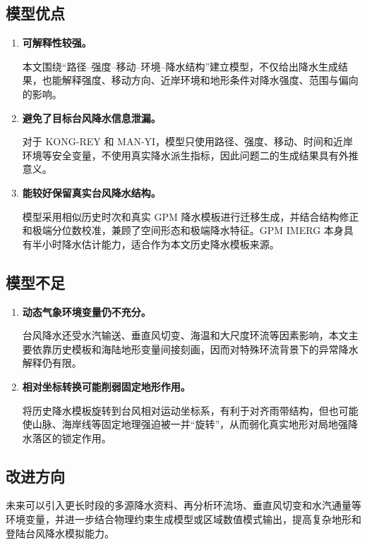 \documentclass[UTF8,a4paper,zihao=5,fontset=fandol]{ctexart}
\numberwithin{equation}{section}
\numberwithin{figure}{section}
\numberwithin{table}{section}
\begin{document}
\subsection{模型优点}
\begin{enumerate}
  \item \textbf{可解释性较强。}

  本文围绕“路径--强度--移动--环境--降水结构”建立模型，不仅给出降水生成结果，也能解释强度、移动方向、近岸环境和地形条件对降水强度、范围与偏向的影响。

  \item \textbf{避免了目标台风降水信息泄漏。}

  对于 KONG-REY 和 MAN-YI，模型只使用路径、强度、移动、时间和近岸环境等安全变量，不使用真实降水派生指标，因此问题二的生成结果具有外推意义。

  \item \textbf{能较好保留真实台风降水结构。}

  模型采用相似历史时次和真实 GPM 降水模板进行迁移生成，并结合结构修正和极端分位数校准，兼顾了空间形态和极端降水特征。GPM IMERG 本身具有半小时降水估计能力，适合作为本文历史降水模板来源\cite{ref2}。
\end{enumerate}

\subsection{模型不足}
\begin{enumerate}
  \item \textbf{动态气象环境变量仍不充分。}

  台风降水还受水汽输送、垂直风切变、海温和大尺度环流等因素影响，本文主要依靠历史模板和海陆地形变量间接刻画，因而对特殊环流背景下的异常降水解释仍有限。

  \item \textbf{相对坐标转换可能削弱固定地形作用。}

  将历史降水模板旋转到台风相对运动坐标系，有利于对齐雨带结构，但也可能使山脉、海岸线等固定地理强迫被一并“旋转”，从而弱化真实地形对局地强降水落区的锁定作用。
\end{enumerate}

\subsection{改进方向}
未来可以引入更长时段的多源降水资料、再分析环流场、垂直风切变和水汽通量等环境变量，并进一步结合物理约束生成模型或区域数值模式输出，提高复杂地形和登陆台风降水模拟能力。
\end{document}
